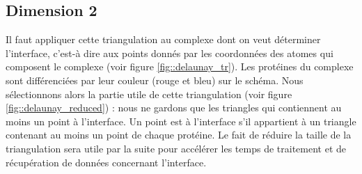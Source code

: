 \subsection*{Dimension 2}

Il faut appliquer cette triangulation au complexe dont on veut déterminer l'interface, c'est-à dire
aux points donnés par les coordonnées des atomes qui composent le complexe
(voir figure \ref{fig::delaunay_tr}). Les protéines du complexe sont différenciées
par leur couleur (rouge et bleu) sur le schéma. Nous sélectionnons alors la partie utile de
cette triangulation (voir figure \ref{fig::delaunay_reduced}) : nous ne gardons que
les triangles qui contiennent au moins un point à l'interface.
Un point est à l'interface s'il appartient à un triangle contenant au moins un point
de chaque protéine. Le fait de réduire la taille de la triangulation sera utile par la suite
pour accélérer les temps de traitement et de récupération de données concernant l'interface.



